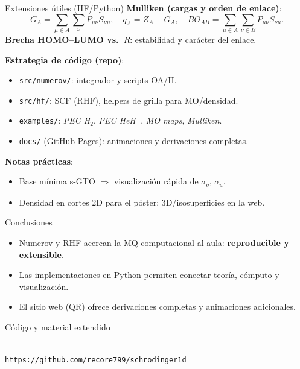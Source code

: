 \documentclass[final]{beamer}
\begin{document}
\begin{frame}[t]
\begin{columns}[t,totalwidth=\textwidth]
\begin{column}{0.32\textwidth}

\begin{block}{Extensiones útiles (HF/Python)}
\textbf{Mulliken (cargas y orden de enlace)}:
\[
  G_A = \sum_{\mu\in A}\sum_\nu P_{\mu\nu} S_{\nu\mu},\quad
  q_A = Z_A - G_A,\quad
  BO_{AB}=\sum_{\mu\in A}\sum_{\nu\in B} P_{\mu\nu} S_{\nu\mu}.
\]
\textbf{Brecha HOMO--LUMO vs.\ $R$}: estabilidad y carácter del enlace.
\medskip

\textbf{Estrategia de código (repo)}:
\begin{itemize}
  \item \texttt{src/numerov/}: integrador y scripts OA/H.
  \item \texttt{src/hf/}: SCF (RHF), helpers de grilla para MO/densidad.
  \item \texttt{examples/}: \emph{PEC H$_2$}, \emph{PEC HeH$^+$}, \emph{MO maps}, \emph{Mulliken}.
  \item \texttt{docs/} (GitHub Pages): animaciones y derivaciones completas.
\end{itemize}

\textbf{Notas prácticas}:
\begin{itemize}
  \item Base mínima s-GTO \(\Rightarrow\) visualización rápida de $\sigma_g$, $\sigma_u$.
  \item Densidad en cortes 2D para el póster; 3D/isosuperficies en la web.
\end{itemize}
\end{block}

\begin{block}{Conclusiones}
\begin{itemize}
  \item Numerov y RHF acercan la MQ computacional al aula: \textbf{reproducible y extensible}.
  \item Las implementaciones en Python permiten conectar teoría, cómputo y visualización.
  \item El sitio web (QR) ofrece derivaciones completas y animaciones adicionales.
\end{itemize}
\end{block}

\begin{block}{Código y material extendido}
\begin{center}
\\[0.4em]
{\small \texttt{https://github.com/recore799/schrodinger1d}}
\end{center}
\end{block}

\end{column}

\end{columns}
\end{frame}
\end{document}
